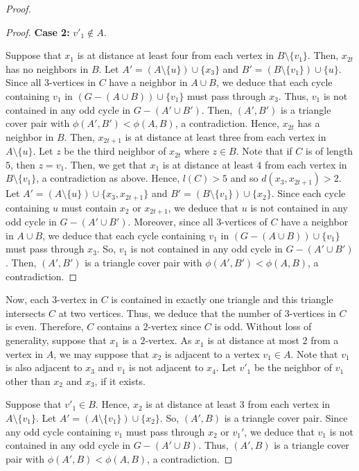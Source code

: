 \documentclass[12pt, oneside]{scrartcl}
\begin{document}
\begin{proof}
\begin{proof}
\medskip
\noindent
\textbf{Case 2:} $v'_1\notin A$.

Suppose that $x_1$ is at distance at least four from each vertex in $B\setminus \{v_1\}$. Then, $x_{2t}$ has no neighbors in $B$. Let $A'=(A\setminus \{u\})\cup \{ x_3\}$ and $B'=(B\setminus \{v_1\})\cup \{u\}$. Since all $3$-vertices in $C$ have a neighbor in $A\cup B$, we deduce that each cycle containing $v_1$ in $(G- (A\cup B))\cup \{v_1\}$ must pass through $x_3$. Thus, $v_1$ is not contained in any odd cycle in $G- (A'\cup B')$. Then, $(A',B')$ is a triangle cover pair with $\phi(A',B')<\phi (A,B)$, a contradiction. Hence, $x_{2t}$ has a neighbor in $B$. Then, $x_{2t+1}$ is at distance at least three from each vertex in $A\setminus\{u\}$. Let $z$ be the third neighbor of $x_{2t}$ where $z\in B$. Note that if $C$ is of length $5$, then $z=v_1$. Then, we get that $x_1$ is at distance at least $4$ from each vertex in $B\setminus \{v_1\}$, a contradiction as above. Hence, $l(C) >5$ and so $d(x_3,x_{2t+1})>2$. Let $A'=(A\setminus\{u\})\cup \{x_3, x_{2t+1}\}$ and 
$B'=(B\setminus\{v_1\})\cup \{x_2\}$. Since each cycle containing $u$ must contain $x_2$ or $x_{2t+1}$, we deduce that $u$ is not contained in any odd cycle in $G-(A'\cup B')$. Moreover, since all $3$-vertices of $C$ have a neighbor in $A\cup B$, we deduce that each cycle containing $v_1$ in $(G- (A\cup B)) \cup \{v_1\}$ must pass through $x_3$. So, $v_1$ is not contained in any odd cycle in $G- (A'\cup B')$. Then, $(A',B')$ is a triangle cover pair with $\phi(A',B')<\phi (A,B)$, a contradiction. 
\end{proof}

Now, each $3$-vertex in $C$ is contained in exactly one triangle and this triangle intersects $C$ at two vertices. Thus, we deduce that the number of $3$-vertices in $C$ is even. Therefore, $C$ contains a $2$-vertex since $C$ is odd. Without loss of generality, suppose that $x_1$ is a $2$-vertex. As $x_1$ is at distance at most $2$ from a vertex in $A$, we may suppose that $x_2$ is adjacent to a vertex $v_1\in A$. Note that $v_1$ is also adjacent to $x_3$ and $v_1$ is not adjacent to $x_4$. Let $v'_1$ be the neighbor of $v_1$ other than $x_2$ and $x_3$, if it exists. 

Suppose that $v'_1\in B$. Hence, $x_2$ is at distance at least $3$ from each vertex in $A\setminus \{v_1\}$. Let $A'=(A\setminus \{v_1\})\cup \{x_2\}$. So, $(A',B)$ is a triangle cover pair. Since any odd cycle containing $v_1$ must pass through $x_2$ or $v_1'$, we deduce that $v_1$ is not contained in any odd cycle in $G-(A'\cup B)$. Thus, $(A',B)$ is a triangle cover pair with $\phi (A',B) < \phi (A,B)$, a contradiction.


\end{proof}
\end{document}
